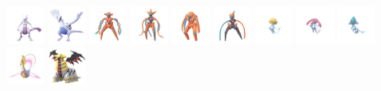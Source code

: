 \documentclass[8pt,aspectratio=169,compress]{beamer}
\begin{document}
\begin{frame}
\begin{tiny}
\begin{block}{}
\begin{center}
    \includegraphics[width=1.25cm]{../../images/pokemon/mewtwo.png}
    \includegraphics[width=1.25cm]{../../images/pokemon/lugia.png}
    \includegraphics[width=1.25cm]{../../images/pokemon/deoxys_n.png}
    \includegraphics[width=1.25cm]{../../images/pokemon/deoxys_a.png}
    \includegraphics[width=1.25cm]{../../images/pokemon/deoxys_d.png}
    \includegraphics[width=1.25cm]{../../images/pokemon/deoxys_s.png}
    \includegraphics[width=1.25cm]{../../images/pokemon/uxie.png}
    \includegraphics[width=1.25cm]{../../images/pokemon/mesprit.png}
    \includegraphics[width=1.25cm]{../../images/pokemon/azelf.png}
    \includegraphics[width=1.25cm]{../../images/pokemon/cresselia.png}
    \includegraphics[width=1.25cm]{../../images/pokemon/giratina_a.png}
\end{center}
\end{block}

\end{tiny}
\end{frame}
\end{document}

